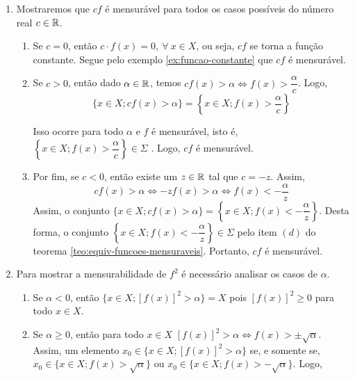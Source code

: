 \begin{prova}
    \begin{enumerate}[label*=(\alph*)]
        \item Mostraremos que $cf$ é mensurável para todos os casos possíveis do número real $c \in \mathbb{R}$.
            \begin{enumerate}[label=(\roman*)]
                \item Se $c = 0$, então $c\cdot f(x) = 0, \ \forall \ x \in X$, ou seja, $cf$ se torna a função constante. Segue pelo exemplo \ref{ex:funcao-constante} que $cf$ é mensurável.
                \item Se $c>0$, então  dado $\alpha \in \mathbb{R}$, temos $cf(x) > \alpha \Leftrightarrow f(x) >\dfrac{\alpha}{c}$. 
                Logo, 
                $$
                \{x \in X; cf(x) > \alpha\} 
                = 
                \left\{x \in X; f(x) > \dfrac{\alpha}{c}\right\}
                $$
                    
                Isso ocorre para todo $\alpha$ e $f$ é mensurável, isto é, $\left\{x \in X; f(x) > \dfrac{\alpha}{c}\right\} \in \Sigma$  . Logo, $cf$ é mensurável.
                \item Por fim, se $c < 0$, então existe um $z \in \mathbb{R}$ tal que $c = -z$.
                Assim, 
                $$cf(x) >\alpha \Leftrightarrow -zf(x) >\alpha \Leftrightarrow f(x) < -\dfrac{\alpha}{z}$$
                Assim, o conjunto $\{x \in X; cf(x) > \alpha \} = \left\{x \in X; f(x) < -\dfrac{\alpha}{z}\right\}$.
                Desta forma, o conjunto  $\left\{x \in X; f(x) < -\dfrac{\alpha}{z}\right\}  \in \Sigma$ pelo  item $(d)$ do teorema \ref{teo:equiv-funcoes-mensuraveis}. Portanto,  $cf$ é mensurável.
            \end{enumerate}
            
        \item Para mostrar a mensurabilidade de $f^2$ é necessário analisar os casos de $\alpha$.
            \begin{enumerate}[label = (\roman*)]
                \item Se $\alpha < 0$, então $\{x \in X; [f(x)]^2 > \alpha\} = X$ pois $[f(x)]^2 \geq 0$ para todo $x \in X$.
                
                \item Se $\alpha \geq 0$, então para todo $x \in X$ $[f(x)]^2 > \alpha \Leftrightarrow f(x) > \pm \sqrt{\alpha}$.
                Assim, um elemento 
                $x_0 \in \{x \in X; [f(x)]^2 > \alpha\}$ se, e somente se, $x_0 \in \{x \in X; f(x)> \sqrt{\alpha}\}$ ou \linebreak $x_0 \in \{x \in X; f(x)> -\sqrt{\alpha}\}$.
                Logo, 
                

\end{enumerate}
\end{enumerate}
\end{prova}
